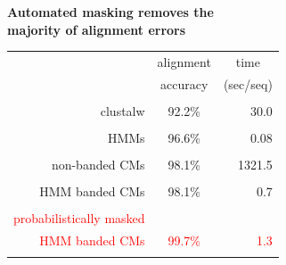 \documentclass[landscape]{slides}
\begin{document}
\begin{slide}
\begin{center}

\textbf{Automated masking removes the \\ majority of alignment errors}
\end{center}
\medskip
\medskip
\begin{center}

\begin{tabular}{rcr} 
& \multicolumn{1}{c}{alignment} & \multicolumn{1}{c}{time} \\
& \multicolumn{1}{c}{accuracy} & \multicolumn{1}{c}{(sec/seq)} \\ \hline
& \multicolumn{1}{c}{} & \multicolumn{1}{c}{} \\
clustalw & 92.2\% & 30.0 \\ 
& \multicolumn{1}{c}{} & \multicolumn{1}{c}{} \\
HMMs & 96.6\% & 0.08 \\ 
& \multicolumn{1}{c}{} & \multicolumn{1}{c}{} \\
non-banded CMs & 98.1\% & 1321.5 \\ 
& \multicolumn{1}{c}{} & \multicolumn{1}{c}{} \\
HMM banded CMs & 98.1\% & 0.7 \\ %
& \multicolumn{1}{c}{} & \multicolumn{1}{c}{} \\
\textcolor{red}{probabilistically masked} & & \\
\textcolor{red}{HMM banded CMs}           & \textcolor{red}{99.7\%} & \textcolor{red}{1.3} \\ %
& \multicolumn{1}{c}{} & \multicolumn{1}{c}{} \\
\end{tabular}
\end{center}


\vfill
\end{slide}
\end{document}
